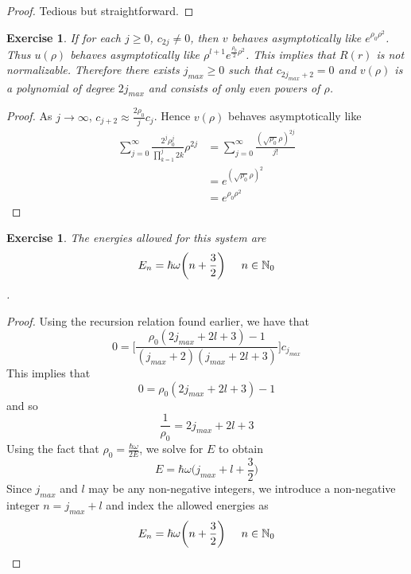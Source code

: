 \documentclass[12pt]{amsart}
\newtheorem{ex}[thm]{Exercise}
\newcommand{\om}{\omega}
\newcommand{\N}{\mathbb{N}}
\begin{document}
\begin{proof}
Tedious but straightforward.
\end{proof}

\begin{ex}
If for each $j \geq 0$, $c_{2j} \neq 0$, then $v$ behaves asymptotically like $e^{\rho_0\rho^2}$. Thus $u(\rho)$ behaves asymptotically like $\rho^{l+1}e^{\frac{\rho_0}{2}\rho^2}$. This implies that $R(r)$ is not normalizable. Therefore there exists $j_{max} \geq 0$ such that $c_{2j_{max}+2} = 0$ and $v(\rho)$ is a polynomial of degree $2j_{max}$ and consists of only even powers of $\rho$. 
\end{ex}

\begin{proof}
As $j \rightarrow \infty$, $c_{j+2} \approx \frac{2 \rho_0}{j}c_j$. Hence $v(\rho)$ behaves asymptotically like 
\begin{align*}
\sum_{j=0}^{\infty}\frac{2^j\rho_0^j}{\prod_{k=1}^j2k}\rho^{2j}
&= \sum_{j=0}^{\infty}\frac{(\sqrt{\rho_0} \rho)^{2j}}{j!}\\
&= e^{(\sqrt{\rho_0}\rho)^2}\\
&= e^{\rho_0 \rho^2}
\end{align*}
\end{proof}

\begin{ex}
The energies allowed for this system are $$E_n = \hbar \om \bigg(n+\frac{3}{2} \bigg) \hspace{.5cm}n \in \N_0$$.
\end{ex}

\begin{proof}
Using the recursion relation found earlier, we have that $$0 = \bigg[ \frac{\rho_0(2j_{max}+2l+3)-1}{(j_{max}+2)(j_{max}+2l+3)}\bigg]c_{j_{max}} $$ This implies that $$0 = \rho_0(2j_{max}+2l+3)-1$$ and so $$\frac{1}{\rho_0} = 2j_{max} + 2l +3$$ Using the fact that $\rho_0 = \frac{\hbar \om}{2E}$, we solve for $E$ to obtain $$E = \hbar \om \bigg( j_{max} + l + \frac{3}{2}\bigg)$$ Since $j_{max}$ and $l$ may be any non-negative integers, we introduce a non-negative integer $n = j_{max}+l$ and index the allowed energies as $$E_n = \hbar \om\bigg(n+ \frac{3}{2} \bigg) \hspace{.5cm} n \in \N_0$$
\end{proof}
\end{document}
